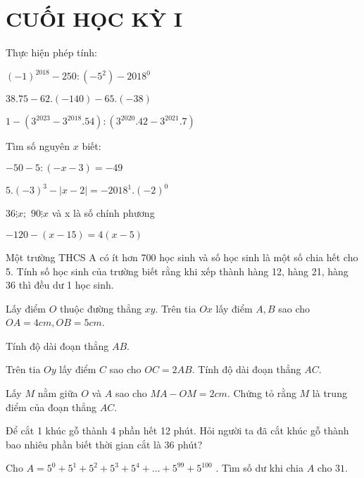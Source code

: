 \section{CUỐI HỌC KỲ I}
\setcounter{ex}{0}
\begin{ex}
	Thực hiện phép tính:
	\begin{listEX}
	\item ${\left( { - 1} \right)^{2018}} - 250:( - {5^2}) - {2018^0}$
\item $38.75 - 62.\left( { - 140} \right) - 65.\left( { - 38} \right)$
\item $1 - ({3^{2023}} - {3^{2018}}.54):({3^{2020}}.42 - {3^{2021}}.7)$
	\end{listEX}
\end{ex}
\begin{ex}
	Tìm số nguyên $x$ biết:
	\begin{listEX}[2]
	\item $ - 50 - 5:( - x - 3) =  - 49$
\item $5.{( - 3)^3} - \left| {x - 2} \right| =  - {2018^1}.{( - 2)^0}$
\item $36 \vdots x;\,\,90 \vdots x$ và x là số chính phương
\item $ - 120 - (x - 15) = 4(x - 5)$
	\end{listEX}
\end{ex}
\begin{ex}
	Một trường THCS A có ít hơn 700 học sinh và số học sinh là một số chia hết cho 5. Tính số học sinh của trường biết rằng khi xếp thành hàng 12, hàng 21, hàng 36 thì đều dư 1 học sinh.
\end{ex}
\begin{ex}
	Lấy điểm $O$ thuộc đường thẳng $xy$. Trên tia $Ox$ lấy điểm $A, B$ sao cho $OA = 4cm, OB = 5cm$.
		\begin{listEX}
			\item Tính độ dài đoạn thẳng $AB$.
			\item Trên tia $Oy$ lấy điểm $C$ sao cho $OC=2AB$. Tính độ dài đoạn thẳng $AC$.
			\item Lấy $M$ nằm giữa $O$ và $A$ sao cho $MA-OM=2cm$. Chứng tỏ rằng $M$ là trung điểm của đoạn thẳng $AC$.
		\end{listEX}
\end{ex}
\begin{ex}
	Để cắt 1 khúc gỗ thành 4 phần hết 12 phút. Hỏi người ta đã cắt khúc gỗ thành bao nhiêu phần biết thời gian cắt là 36 phút?
\end{ex}
\begin{ex}
	Cho  $A = {5^0} + {5^1} + {5^2} + {5^3} + {5^4} + ... + {5^{99}} + {5^{100}}$ . Tìm số dư khi chia $A$ cho $31$.
\end{ex}